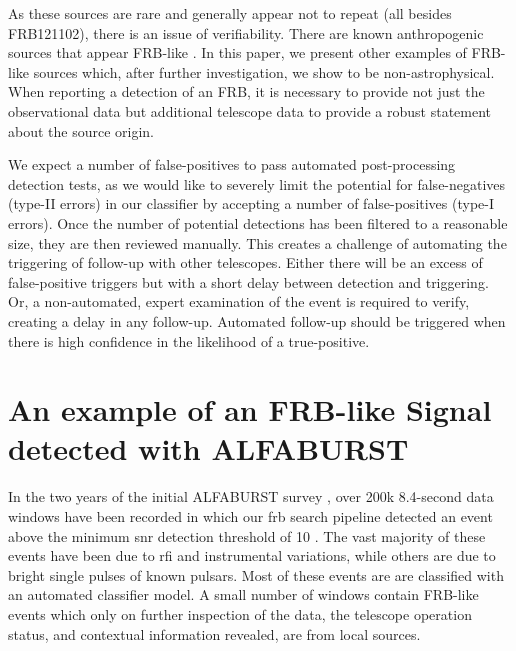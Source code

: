 \documentclass[a4paper,fleqn,usenatbib]{mnras}
\begin{document}
As these sources are rare and generally appear not to repeat (all besides
FRB121102), there is an issue of verifiability. There are known anthropogenic
sources that appear FRB-like \citep{2011ApJ...727...18B}. In this paper, we
present other examples of FRB-like sources which, after further investigation,
we show to be non-astrophysical.  When reporting a detection of an FRB, it is
necessary to provide not just the observational data but additional telescope
data to provide a robust statement about the source origin.

We expect a number of false-positives to pass automated post-processing
detection tests, as we would like to severely limit the potential for
false-negatives (type-II errors) in our classifier by accepting a number of
false-positives (type-I errors). Once the number of potential detections has
been filtered to a reasonable size, they are then reviewed manually. This
creates a challenge of automating the triggering of follow-up with other
telescopes. Either there will be an excess of false-positive triggers but with a
short delay between detection and triggering.  Or, a non-automated, expert
examination of the event is required to verify, creating a delay in any
follow-up. Automated follow-up should be triggered when there is high confidence
in the likelihood of a true-positive.

\section{An example of an FRB-like Signal detected with ALFABURST}
\label{sec:D20161204}

In the two years of the initial ALFABURST survey \citep{2017ApJS..228...21C},
over 200k 8.4-second data windows have been recorded in which our \gls{frb}
search pipeline detected an event above the minimum \gls{snr} detection
threshold of 10 \citep{2018MNRAS.474.3847F}.  The vast majority of these events
have been due to \gls{rfi} and instrumental variations, while others are due to
bright single pulses of known pulsars. Most of these events are are classified
with an automated classifier model. A small number of windows contain FRB-like
events which only on further inspection of the data, the telescope operation
status, and contextual information revealed, are from local sources.
\end{document}
